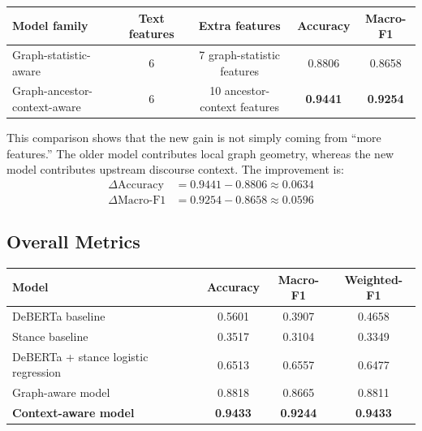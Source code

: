 \documentclass[11pt,a4paper]{article}
\begin{document}
\begin{center}
\begin{tabular}{lcccc}
\toprule
Model family & Text features & Extra features & Accuracy & Macro-F1 \\
\midrule
Graph-statistic-aware & 6 & 7 graph-statistic features & 0.8806 & 0.8658 \\
Graph-ancestor-context-aware & 6 & 10 ancestor-context features & \textbf{0.9441} & \textbf{0.9254} \\
\bottomrule
\end{tabular}
\end{center}

This comparison shows that the new gain is not simply coming from ``more features.'' The older model contributes local graph geometry, whereas the new model contributes upstream discourse context. The improvement is:
\begin{align*}
\Delta \text{Accuracy} &= 0.9441 - 0.8806 \approx 0.0634 \\
\Delta \text{Macro-F1} &= 0.9254 - 0.8658 \approx 0.0596
\end{align*}

\subsection{Overall Metrics}
\begin{center}
\begin{tabular}{lccc}
\toprule
Model & Accuracy & Macro-F1 & Weighted-F1 \\
\midrule
DeBERTa baseline & 0.5601 & 0.3907 & 0.4658 \\
Stance baseline & 0.3517 & 0.3104 & 0.3349 \\
DeBERTa + stance logistic regression & 0.6513 & 0.6557 & 0.6477 \\
Graph-aware model & 0.8818 & 0.8665 & 0.8811 \\
\textbf{Context-aware model} & \textbf{0.9433} & \textbf{0.9244} & \textbf{0.9433} \\
\bottomrule
\end{tabular}
\end{center}
\end{document}
